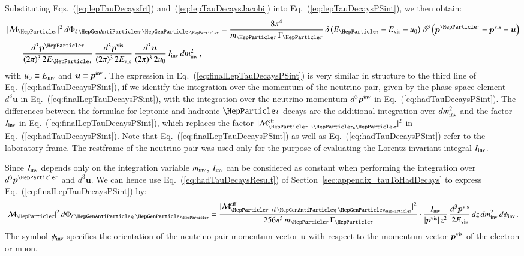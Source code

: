 Substituting Eqs.~(\ref{eq:lepTauDecaysIrf})
and~(\ref{eq:lepTauDecaysJacobi}) into
Eq.~(\ref{eq:lepTauDecaysPSint}), we then obtain:
\begin{align}
& \, \vert\mathcal{M}_{\Pgt}\vert^{2} \,
 d\Phi_{\ellnunu} = \frac{8\pi^{4}}{m_{\Pgt} \, \Gamma_{\Pgt}} \,
 \delta \left( E_{\Pgt} - E_{\vis} - u_{0} \right)
 \, \delta^{3} \left( \bm{p}^{\Pgt} - \bm{p}^{\vis} -
  \bm{u} \right) \nonumber \\
& \qquad \frac{d^{3}\bm{p}^{\Pgt}}{(2\pi)^{3} \, 2 E_{\Pgt}} \,
  \frac{d^{3}\bm{p}^{\vis}}{(2\pi)^{3} \, 2 E_{\vis}} \, 
  \frac{d^{3}\bm{u}}{(2\pi)^{3} \, 2 u_{0}} \, I_{\inv} \,
  dm^{2}_{\inv} \, ,
\label{eq:finalLepTauDecaysPSint}
\end{align}
with $u_{0} \equiv E_{\textrm{inv}}$ and $\bm{u} \equiv \bm{p}^{\textrm{inv}}$.
The expression in Eq.~(\ref{eq:finalLepTauDecaysPSint}) is very similar in structure to the third line of Eq.~(\ref{eq:hadTauDecaysPSint}),
if we identify the integration over the momentum of the neutrino pair,
given by the phase space element $d^{3}\bm{u}$ in Eq.~(\ref{eq:finalLepTauDecaysPSint}), 
with the integration over the neutrino momentum $d^{3}\bm{p}^{\textrm{inv}}$ in Eq.~(\ref{eq:hadTauDecaysPSint}).
The differences between the formulae for leptonic and hadronic $\Pgt$ decays
are the additional integration over $dm^{2}_{\textrm{inv}}$ and the
factor $I_{\textrm{inv}}$ in Eq.~(\ref{eq:finalLepTauDecaysPSint}), which replaces the
factor $\vert\mathcal{M}^{\textrm{eff}}_{\Pgt \to
  \tauh\Pnut}\vert^{2}$ in Eq.~(\ref{eq:hadTauDecaysPSint}).
Note that Eq.~(\ref{eq:finalLepTauDecaysPSint}) as well as Eq.~(\ref{eq:hadTauDecaysPSint}) refer to the laboratory frame.
The restframe of the neutrino pair was used only for the purpose of evaluating the Lorentz invariant integral $I_{\textrm{inv}}$.

Since $I_{\textrm{inv}}$ depends only on the integration variable $m_{\textrm{inv}}$, 
$I_{\textrm{inv}}$ can be considered as constant when performing the integration over $d^{3}\bm{p}^{\Pgt}$ and $d^{3}\bm{u}$.
We can hence use Eq.~(\ref{eq:hadTauDecaysResult}) of Section~\ref{sec:appendix_tauToHadDecays} to express Eq.~(\ref{eq:finalLepTauDecaysPSint}) by:
\begin{align}
\vert\mathcal{M}_{\Pgt}\vert^{2} \,
 d\Phi_{\ellnunu} = \frac{\vert\mathcal{M}^{\eff}_{\Pgt \to
  \ellnunu}\vert^{2}}{256\pi^{5}\, m_{\Pgt} \, \Gamma_{\Pgt}} \cdot 
    \frac{I_{\inv}}{\vert\bm{p}^{\vis}\vert \, z^{2}} \, 
    \frac{d^{3}\bm{p}^{\vis}}{2 E_{\vis}} \, dz \, dm^{2}_{\inv} \,
    d\phi_{\inv} \, .
\label{eq:lepTauDecaysResult}
\end{align}
The symbol $\phi_{\textrm{inv}}$ specifies the orientation of the neutrino
pair momentum vector $\bm{u}$ with respect to the momentum vector $\bm{p}^{\textrm{vis}}$
of the electron or muon.

